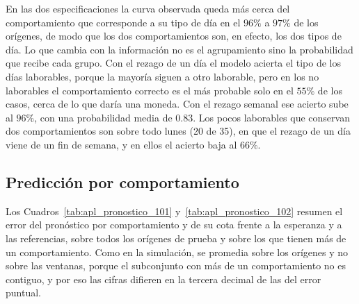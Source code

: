 En las dos especificaciones la curva observada queda más cerca del comportamiento que corresponde a su tipo de día en el $96\%$ a $97\%$ de los orígenes, de modo que los dos comportamientos son, en efecto, los dos tipos de día. Lo que cambia con la información no es el agrupamiento sino la probabilidad que recibe cada grupo. Con el rezago de un día el modelo acierta el tipo de los días laborables, porque la mayoría siguen a otro laborable, pero en los no laborables el comportamiento correcto es el más probable solo en el $55\%$ de los casos, cerca de lo que daría una moneda. Con el rezago semanal ese acierto sube al $96\%$, con una probabilidad media de $0.83$. Los pocos laborables que conservan dos comportamientos son sobre todo lunes (20 de 35), en que el rezago de un día viene de un fin de semana, y en ellos el acierto baja al $66\%$.

\subsection{Predicción por comportamiento}
\label{04_03_04_pronostico}

Los Cuadros~\ref{tab:apl_pronostico_101} y~\ref{tab:apl_pronostico_102} resumen el error del pronóstico por comportamiento y de su cota frente a la esperanza y a las referencias, sobre todos los orígenes de prueba y sobre los que tienen más de un comportamiento. Como en la simulación, se promedia sobre los orígenes y no sobre las ventanas, porque el subconjunto con más de un comportamiento no es contiguo, y por eso las cifras difieren en la tercera decimal de las del error puntual.

